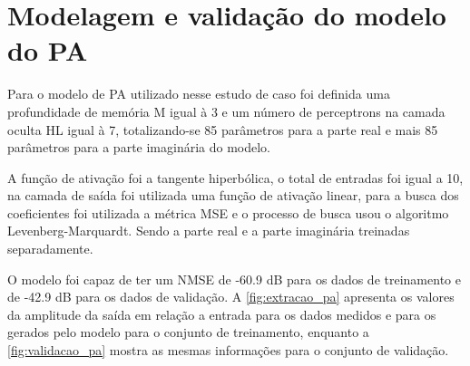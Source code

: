 \section{Modelagem e validação do modelo do PA} \label{sec:estudoi-model}
Para o modelo de PA utilizado nesse estudo de caso foi definida uma profundidade de memória M igual à 3 e um número de perceptrons na camada oculta HL igual à 7, totalizando-se 85 parâmetros para a parte real e mais 85 parâmetros para a parte imaginária do modelo.


A função de ativação foi a tangente hiperbólica, o total de entradas foi igual a 10, na camada de saída foi utilizada uma função de ativação linear, para a busca dos coeficientes foi utilizada a métrica MSE e o processo de busca usou o algoritmo Levenberg-Marquardt. Sendo a parte real e a parte imaginária treinadas separadamente.

O modelo foi capaz de ter um NMSE de -60.9 dB para os dados de treinamento e de -42.9 dB para os dados de validação. A \autoref{fig:extracao_pa} apresenta os valores da amplitude da saída em relação a entrada para os dados medidos e para os gerados pelo modelo para o conjunto de treinamento, enquanto a \autoref{fig:validacao_pa} mostra as mesmas informações para o conjunto de validação.

